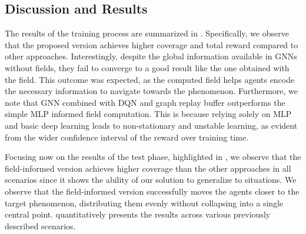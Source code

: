 \documentclass[conference]{IEEEtran}
\begin{document}
\subsection{Discussion and Results}
The results of the training process are summarized in . 
%
Specifically, we observe that the proposed version achieves higher coverage and total reward compared to other approaches. 
%
Interestingly, despite the global information available in \acp{GNN} without fields, they fail to converge to a good result like the one obtained with the field. 
%
This outcome was expected, as the computed field helps agents encode the necessary information to navigate towards the phenomenon.
%
Furthermore, we note that \ac{GNN} combined with \ac{DQN} and graph replay buffer outperforms the simple \ac{MLP} informed field computation. 
%
This is because relying solely on \ac{MLP} and basic deep learning leads to non-stationary and unstable learning, 
 as evident from the wider confidence interval of the reward over training time.

Focusing now on the results of the test phase, highlighted in  ,
 we observe that the field-informed version achieves higher coverage than the other approaches in all scenarios since it shows the ability of our solution to generalize to situations. 
% 
We observe that the field-informed version successfully moves the agents closer to the target phenomenon, 
 distributing them evenly without collapsing into a single central point. 
  quantitatively presents the results across various previously described scenarios.
\end{document}
